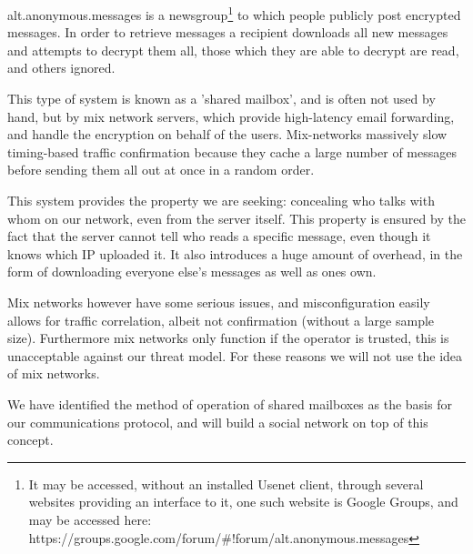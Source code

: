alt.anonymous.messages is a newsgroup\footnote{It may be accessed, without an
installed Usenet client, through several websites providing an interface to it,
one such website is Google Groups, and may be accessed here:
https://groups.google.com/forum/\#!forum/alt.anonymous.messages} to which people
publicly post encrypted messages. In order to retrieve messages a recipient
downloads all new messages and attempts to decrypt them all, those which they
are able to decrypt are read, and others ignored.

This type of system is known as a 'shared mailbox', and is often not used by
hand, but by mix network servers, which provide high-latency email forwarding,
and handle the encryption on behalf of the users. Mix-networks massively slow
timing-based traffic confirmation because they cache a large number of messages
before sending them all out at once in a random order\cite{mixnetOperation}.

This system provides the property we are seeking: concealing who talks with whom
on our network, even from the server itself. This property is ensured by the
fact that the server cannot tell who reads a specific message, even though it
knows which IP uploaded it. It also introduces a huge amount of overhead, in the
form of downloading everyone else's messages as well as ones own.

Mix networks however have some serious issues, and misconfiguration easily
allows for traffic correlation\cite{mixnet}, albeit not confirmation (without a
large sample size). Furthermore mix networks only function if the operator is
trusted, this is unacceptable against our threat model. For these reasons we will not
use the idea of mix networks.

We have identified the method of operation of shared mailboxes as the basis for
our communications protocol, and will build a social network on top of this 
concept.
